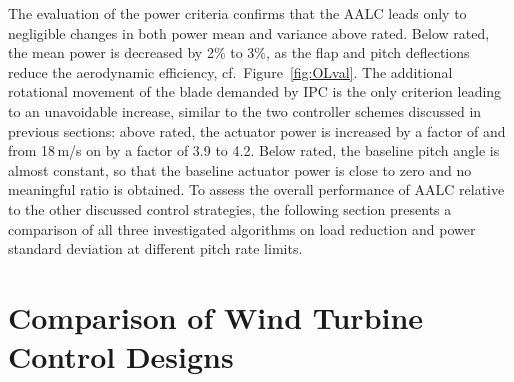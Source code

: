The evaluation of the power criteria confirms that the AALC leads only to negligible changes in both power mean and variance above rated. Below rated, the mean power is decreased by 2\% to 3\%, as the flap and pitch deflections reduce the aerodynamic efficiency, cf.\ Figure~\ref{fig:OLval}. The additional rotational movement of the blade demanded by IPC is the only criterion leading to an unavoidable increase, similar to the two controller schemes discussed in previous sections: above rated, the actuator power is increased by a factor of  and from 18\,m/s on by a factor of 3.9 to 4.2. Below rated, the baseline pitch angle is almost constant, so that the baseline actuator power is close to zero and no meaningful ratio is obtained. To assess the overall performance of AALC relative to the other discussed control strategies, the following section presents a comparison of all three investigated algorithms on load reduction and  power standard deviation at different pitch rate limits.

\section{Comparison of Wind Turbine Control Designs}
\label{subsec:ComparisonWindTurbineControlDesigns}

